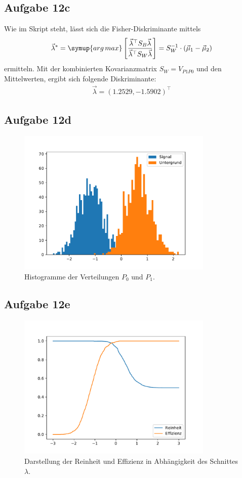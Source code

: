     \subsection{Aufgabe 12c}

    Wie im Skript steht, lässt sich die Fisher-Diskriminante mittels
    \begin{align}
      \vec{\lambda}^{*} = \symup{arg\,max}\left[\frac{\vec{\lambda}^\top S_B \vec{\lambda}}{\vec{\lambda}^\top S_W \vec{\lambda}}\right] = S_W^{-1}\cdot(\vec{\mu}_1-\vec{\mu}_2)
    \end{align}
    ermitteln. Mit der kombinierten Kovarianzmatrix $S_W = V_{P1P0}$ und den Mittelwerten, ergibt
    sich folgende Diskriminante:
    \begin{align}
      \vec{\lambda} = (1.2529,-1.5902)^\top
    \end{align}

    \subsection{Aufgabe 12d}

    \begin{figure}[H]
      \centering
      \includegraphics[height=7cm]{hist.pdf}
      \caption{Histogramme der Verteilungen $P_0$ und $P_1$.}
      \label{fig:hist}
    \end{figure}

    \subsection{Aufgabe 12e}

    \begin{figure}[H]
      \centering
      \includegraphics[height=7cm]{reinheit.pdf}
      \caption{Darstellung der Reinheit und Effizienz in Abhängigkeit des Schnittes $\lambda$.}
      \label{fig:reinheit}
    \end{figure}




